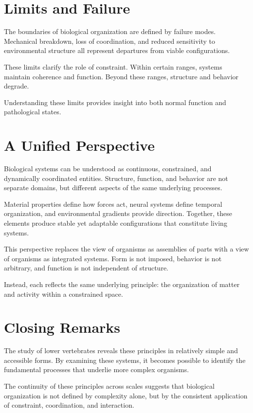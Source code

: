 \documentclass[11pt,oneside]{book}
\begin{document}
\section{Limits and Failure}

The boundaries of biological organization are defined by failure modes. Mechanical breakdown, loss of coordination, and reduced sensitivity to environmental structure all represent departures from viable configurations.

These limits clarify the role of constraint. Within certain ranges, systems maintain coherence and function. Beyond these ranges, structure and behavior degrade.

Understanding these limits provides insight into both normal function and pathological states.

\section{A Unified Perspective}

Biological systems can be understood as continuous, constrained, and dynamically coordinated entities. Structure, function, and behavior are not separate domains, but different aspects of the same underlying processes.

Material properties define how forces act, neural systems define temporal organization, and environmental gradients provide direction. Together, these elements produce stable yet adaptable configurations that constitute living systems.

This perspective replaces the view of organisms as assemblies of parts with a view of organisms as integrated systems. Form is not imposed, behavior is not arbitrary, and function is not independent of structure.

Instead, each reflects the same underlying principle: the organization of matter and activity within a constrained space.

\section{Closing Remarks}

The study of lower vertebrates reveals these principles in relatively simple and accessible forms. By examining these systems, it becomes possible to identify the fundamental processes that underlie more complex organisms.

The continuity of these principles across scales suggests that biological organization is not defined by complexity alone, but by the consistent application of constraint, coordination, and interaction.
\end{document}
